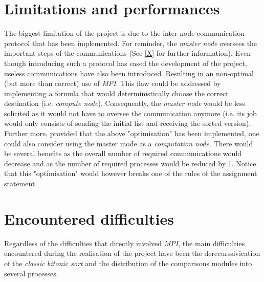 \documentclass[a4paper,11pt]{article}
\begin{document}
\section{Limitations and performances}

  The biggest limitation of the project is due to the inter-node communication protocol that has been implemented. For reminder, the \textit{master node} oversees the important steps of the communications (See \ref{X} for further information). %
  Even though introducing such a protocol has eased the development of the project, useless communications have also been introduced. Resulting in an non-optimal (but more than correct) use of \textit{MPI}.
  This flaw could be addressed by implementing a formula that would deterministically choose the correct destination (i.e. \textit{compute node}). Consequently, the \textit{master node} would be less solicited as it would not have to oversee the communication anymore (i.e. its job would only consists of sending the initial list and receiving the sorted version).\\
  
  \noindent Further more, provided that the above "optimisation" has been implemented, one could also consider using the master mode as a \textit{computation node}. There would be several benefits as the overall number of required communications would decrease and as the number of required processes would be reduced by 1. Notice that this "optimisation" would however breaks one of the rules of the assignment statement.

\section{Encountered difficulties}

  Regardless of the difficulties that directly involved \textit{MPI}, the main difficulties encountered during the realisation of the project have been the derecurssivication of the \textit{classic} \textit{bitonic sort} and the distribution of the comparisons modules into several processes. 
\end{document}
